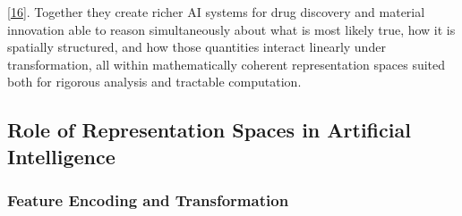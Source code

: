 \documentclass[
]{article}
\begin{document}
{[}\hyperref[_bookmark56]{16}{]}. Together they create richer AI systems
for drug discovery and material innovation able to reason simultaneously
about what is most likely true, how it is spatially structured, and how
those quantities interact linearly under transformation, all within
mathematically coherent representation spaces suited both for rigorous
analysis and tractable computation.

\subsection{Role of Representation Spaces in Artificial
Intelligence}\label{role-of-representation-spaces-in-artificial-intelligence}

\subsubsection{Feature Encoding and
Transformation}\label{feature-encoding-and-transformation}
\end{document}
